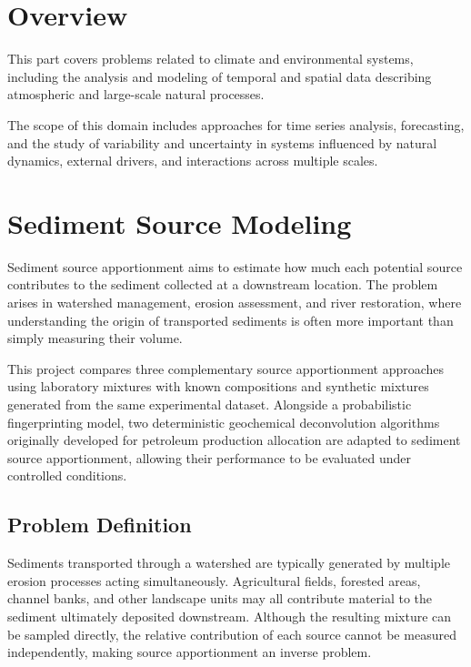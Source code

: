 \documentclass[
  12pt,
  letterpaper,
]{book}
\begin{document}
\chapter*{Overview}\label{overview-4}


This part covers problems related to climate and environmental systems,
including the analysis and modeling of temporal and spatial data
describing atmospheric and large-scale natural processes.

The scope of this domain includes approaches for time series analysis,
forecasting, and the study of variability and uncertainty in systems
influenced by natural dynamics, external drivers, and interactions
across multiple scales.

\chapter{Sediment Source Modeling}\label{sediment-source-modeling}

Sediment source apportionment aims to estimate how much each potential
source contributes to the sediment collected at a downstream location.
The problem arises in watershed management, erosion assessment, and
river restoration, where understanding the origin of transported
sediments is often more important than simply measuring their volume.

This project compares three complementary source apportionment
approaches using laboratory mixtures with known compositions and
synthetic mixtures generated from the same experimental dataset.
Alongside a probabilistic fingerprinting model, two deterministic
geochemical deconvolution algorithms originally developed for petroleum
production allocation are adapted to sediment source apportionment,
allowing their performance to be evaluated under controlled conditions.

\section{Problem Definition}\label{problem-definition-10}

Sediments transported through a watershed are typically generated by
multiple erosion processes acting simultaneously. Agricultural fields,
forested areas, channel banks, and other landscape units may all
contribute material to the sediment ultimately deposited downstream.
Although the resulting mixture can be sampled directly, the relative
contribution of each source cannot be measured independently, making
source apportionment an inverse problem.
\end{document}
